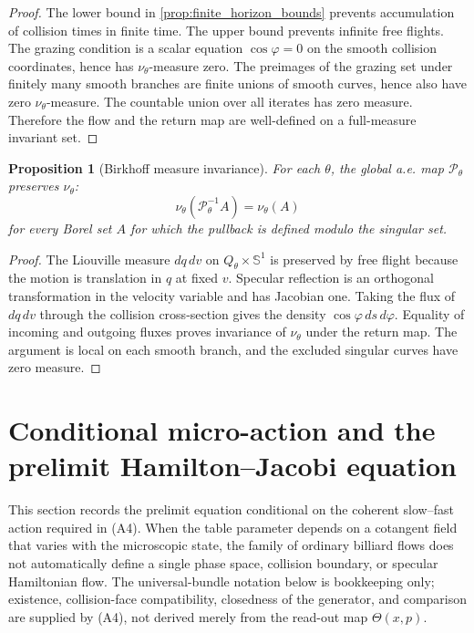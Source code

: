 \documentclass[12pt, letterpaper]{amsart}
\newcommand{\Pcal}{\mathcal{P}}
\theoremstyle{plain}
\newtheorem{proposition}[theorem]{Proposition}
\theoremstyle{definition}
\theoremstyle{remark}
\begin{document}
\begin{proof}
The lower bound in \cref{prop:finite_horizon_bounds} prevents accumulation of collision times in finite time.  The upper bound prevents infinite free flights.  The grazing condition is a scalar equation $\cos\varphi=0$ on the smooth collision coordinates, hence has $\nu_\theta$-measure zero.  The preimages of the grazing set under finitely many smooth branches are finite unions of smooth curves, hence also have zero $\nu_\theta$-measure.  The countable union over all iterates has zero measure.  Therefore the flow and the return map are well-defined on a full-measure invariant set.
\end{proof}

\begin{proposition}[Birkhoff measure invariance]
\label{prop:birkhoff_invariance}
For each $\theta$, the global a.e. map $\Pcal_\theta$ preserves $\nu_\theta$:
\begin{equation}
    \nu_\theta(\Pcal_\theta^{-1}A)=\nu_\theta(A)
\end{equation}
for every Borel set $A$ for which the pullback is defined modulo the singular set.
\end{proposition}

\begin{proof}
The Liouville measure $dq\,dv$ on $Q_\theta\times\mathbb S^1$ is preserved by free flight because the motion is translation in $q$ at fixed $v$.  Specular reflection is an orthogonal transformation in the velocity variable and has Jacobian one.  Taking the flux of $dq\,dv$ through the collision cross-section gives the density $\cos\varphi\,ds\,d\varphi$.  Equality of incoming and outgoing fluxes proves invariance of $\nu_\theta$ under the return map.  The argument is local on each smooth branch, and the excluded singular curves have zero measure.
\end{proof}

\section{Conditional micro-action and the prelimit Hamilton--Jacobi equation}
\label{sec:first_principles_prelimit}

This section records the prelimit equation conditional on the coherent
slow--fast action required in \textup{(A4)}.  When the table parameter depends
on a cotangent field that varies with the microscopic state, the family of
ordinary billiard flows does not automatically define a single phase space,
collision boundary, or specular Hamiltonian flow.  The universal-bundle
notation below is bookkeeping only; existence, collision-face compatibility,
closedness of the generator, and comparison are supplied by \textup{(A4)}, not
derived merely from the read-out map $\Theta(x,p)$.
\end{document}
